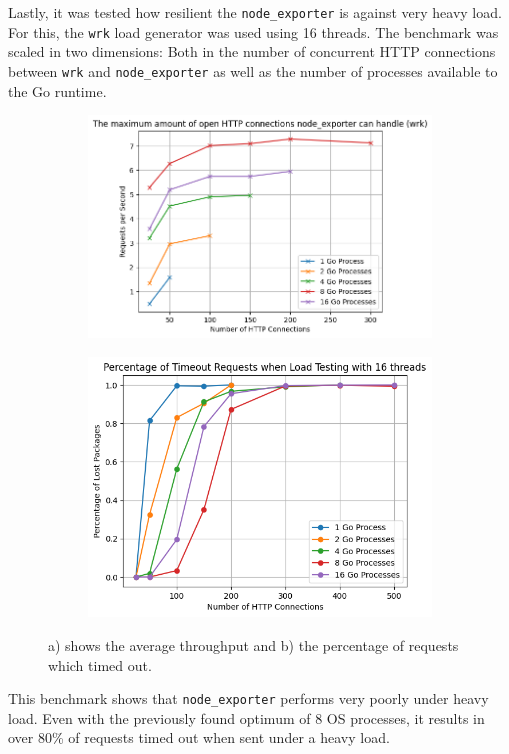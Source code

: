 Lastly, it was tested how resilient the \texttt{node\_exporter} is against very heavy load. For this, the \texttt{wrk} load generator was used using 16 threads. The benchmark was scaled in two dimensions: Both in the number of concurrent HTTP connections between \texttt{wrk} and \texttt{node\_exporter} as well as the number of processes available to the Go runtime.
\begin{figure}[H]
\centering
\begin{subfigure}{.5\textwidth}
  \centering
  \includegraphics[width=\textwidth]{./plots/node_exporter_throughput.png}
  \caption{}
\end{subfigure}%
\begin{subfigure}{.5\textwidth}
  \centering
  \includegraphics[width=\textwidth]{./plots/node_exporter_errors.png}
  \caption{}
\end{subfigure}
  \caption{a) shows the average throughput and b) the percentage of requests which timed out.}
\end{figure}
This benchmark shows that \texttt{node\_exporter} performs very poorly under heavy load. Even with the previously found optimum of 8 OS processes, it results in over 80\% of requests timed out when sent under a heavy load.
